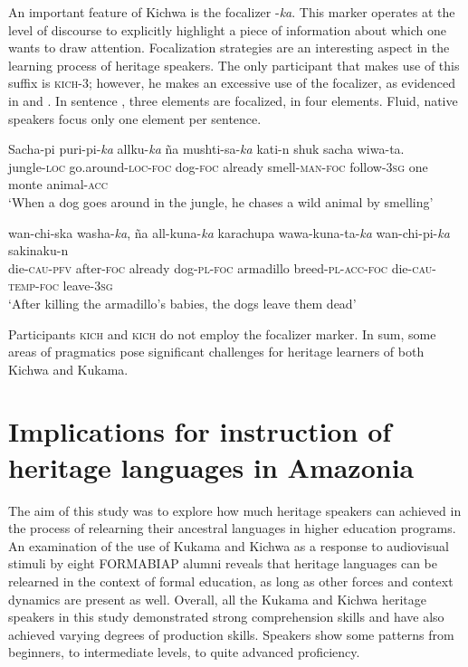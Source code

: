 \documentclass[output=paper]{langscibook}
\begin{document}
An important feature of Kichwa is the focalizer -\textit{ka}. This marker operates at the level of discourse to explicitly highlight a piece of information about which one wants to draw attention. Focalization strategies are an interesting aspect in the learning process of heritage speakers. The only participant that makes use of this suffix is \textsc{kich}{}-3; however, he makes an excessive use of the focalizer, as evidenced in  and . In sentence , three elements are focalized, in  four elements. Fluid, native speakers focus only one element per sentence.

\begin{exe}
\ex\label{ex:7:12}
\gll    Sacha-pi         puri-pi-\textit{{ka}} allku-\textit{{ka}} ña          mushti-sa-\textit{{ka}} kati-n shuk   sacha   wiwa-ta.\\
  jungle-\textsc{loc}  go.around-\textsc{loc-}\textsc{foc}  dog-\textsc{foc}   already   smell-\textsc{man}{}-\textsc{foc}  follow-\textsc{3sg}  one  monte  animal-\textsc{acc}\\
\glt ‘When a dog goes around in the jungle, he chases a wild animal by smelling’
\end{exe}

\begin{exe}
\ex\label{ex:7:13}
\gll wan-chi-ska   washa-\textit{{ka}},   ña    all-kuna-\textit{{ka}} karachupa   wawa-kuna-ta-\textit{{ka}} wan-chi-pi-\textit{{ka}} sakinaku-n\\
  die-\textsc{cau}{}-\textsc{pfv}  after-\textsc{foc}  already   dog-\textsc{pl-}\textsc{foc}  armadillo  breed-\textsc{pl-acc-}\textsc{foc} die-\textsc{cau-temp-foc}  leave-\textsc{3sg}\\
\glt     ‘After killing the armadillo’s babies, the dogs leave them dead’
\end{exe}

Participants \textsc{kich} and \textsc{kich} do not employ the focalizer marker. In sum, some areas of pragmatics pose significant challenges for heritage learners of both Kichwa and Kukama.


\section{{Implications for instruction of heritage languages in Amazonia}}\label{sec:7:7}

The aim of this study was to explore how much heritage speakers can achieved in the process of relearning their ancestral languages in higher education programs. An examination of the use of Kukama and Kichwa as a response to audiovisual stimuli by eight FORMABIAP alumni reveals that heritage languages can be relearned in the context of formal education, as long as other forces and context dynamics are present as well. Overall, all the Kukama and \textsc{K}ichwa heritage speakers in this study demonstrated strong comprehension skills and have also achieved varying degrees of production skills. Speakers show some patterns from beginners, to intermediate levels, to quite advanced proficiency.
\end{document}
